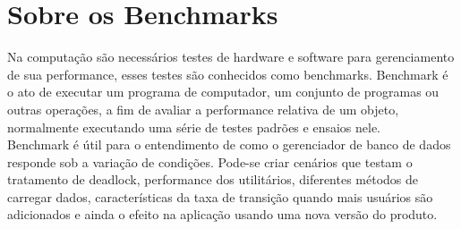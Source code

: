 \section{Sobre os Benchmarks} \label{sec:bench}
	Na computação são necessários testes de hardware e software para gerenciamento de sua performance, esses testes são conhecidos como benchmarks. Benchmark é o ato de executar um programa de computador, um conjunto de programas ou outras operações, a fim de avaliar a performance relativa de um objeto, normalmente executando uma série de testes padrões e ensaios nele.\\
	Benchmark é útil para o entendimento de como o gerenciador de banco de dados responde sob a variação de condições. Pode-se criar cenários que testam o tratamento de deadlock, performance dos utilitários, diferentes métodos de carregar dados, características da taxa de transição quando mais usuários são adicionados e ainda o efeito na aplicação usando uma nova versão do produto.
